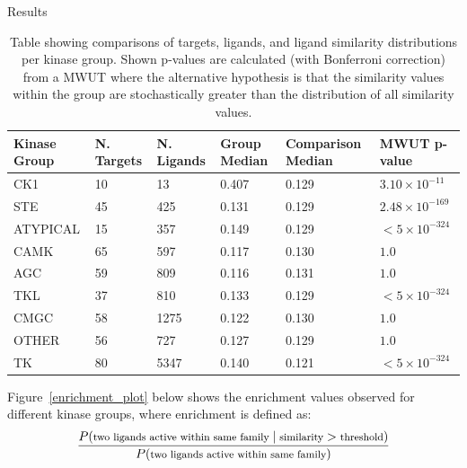 \documentclass[final]{beamer}
\newlength{\colwidth}
\begin{document}
\begin{frame}[t]
\begin{columns}[t]
\begin{column}{\colwidth}
\begin{block}{Results}
    \begin{table}[!ht]
    \centering
    \footnotesize
    \begin{tabular}{l|l|l|l|l|l}
        \hline
        \textbf{Kinase Group} & \textbf{N. Targets} & \textbf{N. Ligands} & \textbf{Group Median} &\textbf{Comparison Median} & \textbf{MWUT p-value} \\ \hline
        CK1 & 10 & 13 & 0.407 & 0.129 & $3.10 \times 10^{-11}$ \\ \hline
        STE & 45 & 425 & 0.131 & 0.129 & $2.48 \times 10^{-169}$ \\ \hline
        ATYPICAL & 15 & 357 & 0.149 & 0.129 & $< 5 \times 10^{-324}$ \\ \hline
        CAMK & 65 & 597 & 0.117 & 0.130 & $1.0$ \\ \hline
        AGC & 59 & 809 & 0.116 & 0.131 & $1.0$ \\ \hline
        TKL & 37 & 810 & 0.133 & 0.129 & $< 5 \times 10^{-324}$ \\ \hline
        CMGC & 58 & 1275 & 0.122 & 0.130 & $1.0$ \\ \hline
        OTHER & 56 & 727 & 0.127 & 0.129 & $1.0$ \\ \hline
        TK & 80 & 5347 & 0.140 & 0.121 & $< 5 \times 10^{-324}$ \\ \hline
    \end{tabular}
    \caption{Table showing comparisons of targets, ligands, and ligand similarity distributions per kinase group. Shown p-values are calculated (with Bonferroni correction) from a MWUT where the alternative hypothesis is that the similarity values within the group are stochastically greater than the distribution of all similarity values.}\label{results_table}
    \end{table}
    Figure~\ref{enrichment_plot} below shows the enrichment values observed for different kinase groups, where enrichment is defined as:
    \begin{equation*}
        \footnotesize
        \frac{P(\text{two ligands active within same family} \; | \; \text{similarity} > \text{threshold})}{P(\text{two ligands active within same family})}
    \end{equation*}
    \begin{figure}
        \centering

\end{figure}
\end{block}
\end{column}
\end{columns}
\end{frame}
\end{document}
